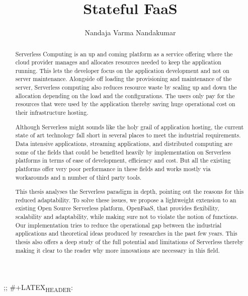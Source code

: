 \documentclass[12pt,titlepage]{article}
\author{Nandaja Varma Nandakumar}
\date{}
\title{Stateful FaaS}
\begin{document}
\maketitle




;; \#+LATEX\textsubscript{HEADER}: \usepackage[natbib=true]{biblatex}  
\begin{abstract}
Serverless Computing is an up and coming platform as a service offering 
where the cloud provider manages and allocates
resources needed to keep the application running. This lets the developer focus on the application development
and not on server maintenance. Alongside off loading the provisioning and
maintenance of the server, Serverless computing also reduces resource waste
by scaling up and down the allocation depending on the load and the
configurations. The users only pay for the resources that were used by the
application thereby saving huge operational cost on their infrastructure
hosting.

Although Serverless might sounds like the holy grail of application hosting, the 
current state of art technology fall short in several places to meet the industrial
requirements. Data intensive applications, streaming applications, and
distributed computing are some of the fields that could be benefited heavily by
implementation on Serverless platforms in terms of ease of development,
efficiency and cost. But all the existing platforms offer very
poor performance in these fields and works mostly via workarounds and n number
of third party tools.

This thesis analyses the Serverless paradigm in depth,
pointing out the reasons for this reduced adaptability. To solve these issues, we propose a lightweight
extension to an existing Open Source Serverless platform, OpenFaaS, that provides
flexibility, scalability and adaptability, while making sure not to violate the notion
of functions. Our implementation tries to reduce the operational gap between the
industrial applications and theoretical ideas produced by researches in the past few years.
This thesis also offers a deep study of the full potential and limitations of
Serverless thereby making it clear to the reader why more innovations are
necessary in this field.

\end{abstract}

\setcounter{tocdepth}{5}
\tableofcontents
\end{document}
